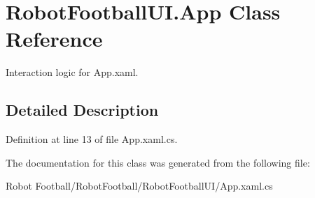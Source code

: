 \hypertarget{class_robot_football_u_i_1_1_app}{\section{Robot\-Football\-U\-I.\-App Class Reference}
\label{class_robot_football_u_i_1_1_app}
}


Interaction logic for App.\-xaml.  




\subsection{Detailed Description}


Definition at line 13 of file App.\-xaml.\-cs.



The documentation for this class was generated from the following file\-:\begin{DoxyCompactItemize}
\item 
Robot Football/\-Robot\-Football/\-Robot\-Football\-U\-I/App.\-xaml.\-cs\end{DoxyCompactItemize}
